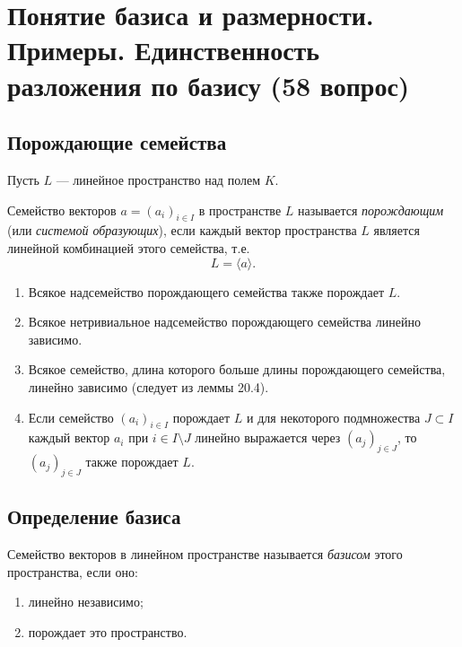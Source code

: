 \documentclass[a4paper,12pt]{article}
\theoremstyle{definition}
\theoremstyle{plain}
\theoremstyle{remark}
\begin{document}
	
	
	
	
	\newpage
	\section{Понятие базиса и размерности. Примеры. Единственность разложения по базису (58 вопрос)}
	
	\subsection{Порождающие семейства}
	
	Пусть \( L \) — линейное пространство над полем \( K \).
	
	\begin{tcolorbox}[colback=blue!5, colframe=blue!40!black, title=Определение]
		Семейство векторов \( a = (a_i)_{i \in I} \) в пространстве \( L \) называется \textit{порождающим} (или \textit{системой образующих}), если каждый вектор пространства \( L \) является линейной комбинацией этого семейства, т.е.
		\[
		L = \langle a \rangle.
		\]
	\end{tcolorbox}
	
	\begin{tcolorbox}[colback=green!5, colframe=green!50!black, title=Свойства порождающих семейств]
		\begin{enumerate}
			\item Всякое надсемейство порождающего семейства также порождает \( L \).
			\item Всякое нетривиальное надсемейство порождающего семейства линейно зависимо.
			\item Всякое семейство, длина которого больше длины порождающего семейства, линейно зависимо (следует из леммы 20.4).
			\item Если семейство \( (a_i)_{i \in I} \) порождает \( L \) и для некоторого подмножества \( J \subset I \) каждый вектор \( a_i \) при \( i \in I \setminus J \) линейно выражается через \( (a_j)_{j \in J} \), то \( (a_j)_{j \in J} \) также порождает \( L \).
		\end{enumerate}
	\end{tcolorbox}
	
	\subsection{Определение базиса}
	
	\begin{tcolorbox}[colback=red!5, colframe=red!50!black, title=Определение]
		Семейство векторов в линейном пространстве называется \textit{базисом} этого пространства, если оно:
		\begin{enumerate}
			\item линейно независимо;
			\item порождает это пространство.
		\end{enumerate}
	\end{tcolorbox}
	
\end{document}
